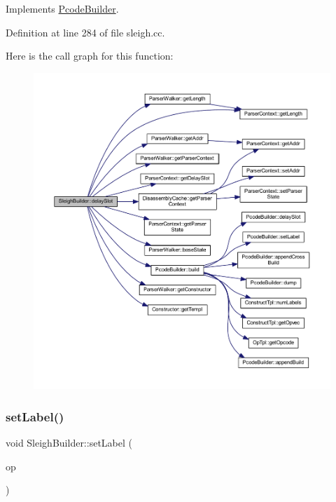 Implements \mbox{\hyperlink{class_pcode_builder_a229a55795ad8c72be40f1d2125751035}{Pcode\+Builder}}.



Definition at line 284 of file sleigh.\+cc.

Here is the call graph for this function\+:
\nopagebreak
\begin{figure}[H]
\begin{center}
\leavevmode
\includegraphics[width=350pt]{class_sleigh_builder_aa6cee1d2f18ab2d9e3ff24a41fe80770_cgraph}
\end{center}
\end{figure}
\mbox{\label{class_sleigh_builder_ad5b3ee580fec7e944389fb51ba798e3c}} 
\subsubsection{\texorpdfstring{setLabel()}{setLabel()}}
{\footnotesize\ttfamily void Sleigh\+Builder\+::set\+Label (\begin{DoxyParamCaption}\item[{\mbox{\hyperlink{class_op_tpl}{Op\+Tpl}} $\ast$}]{op }\end{DoxyParamCaption})\hspace{0.3cm}{\ttfamily [virtual]}}



